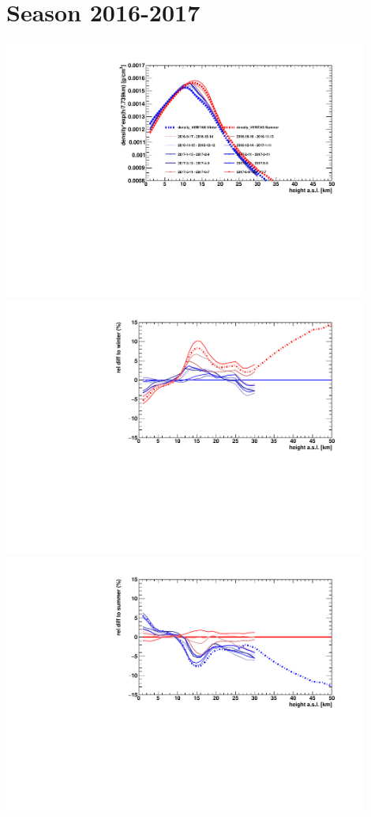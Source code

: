 \section*{Season 2016-2017}
\noindent\begin{minipage}{\textwidth}
\centering
\includegraphics[width=0.9\textwidth]{season-2016-2017-density.pdf}
\includegraphics[width=0.9\textwidth]{season-relativeWinter-2016-2017-density.pdf}
\includegraphics[width=0.9\textwidth]{season-relativeSummer-2016-2017-density.pdf}
\end{minipage}
